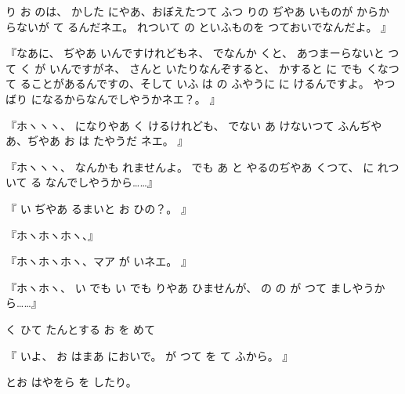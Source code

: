 り
お
のは、
かした
にやあ、おぼえたつて
ふつ
りの
ぢやあ
いものが
からか
らないが
て
るんだネエ。
れついて
の
といふものを
つておいでなんだよ。
』

『なあに、
ぢやあ
いんですけれどもネ、
でなんか
くと、
あつまーらないと
つて
く
が
いんですがネ、
さんと
いたりなんぞすると、
かすると
に
でも
くなつて
ることがあるんですの、そして
いふ
は
の
ふやうに
に
けるんですよ。
やつばり
になるからなんでしやうかネエ？。
』

『ホヽヽヽ、
になりやあ
く
けるけれども、
でない
あ
けないつて
ふんぢやあ、ぢやあ
お
は
たやうだ
ネエ。
』

『ホヽヽヽ、
なんかも
れませんよ。
でも
あ
と
やるのぢやあ
くつて、
に
れついて
る
なんでしやうから……』

『
い
ぢやあ
るまいと
お
ひの？。
』

『ホヽホヽホヽ、』

『ホヽホヽホヽ、マア
が
いネエ。
』

『ホヽホヽ、
い
でも
い
でも
りやあ
ひませんが、
の
の
が
つて
ましやうから……』

く
ひて
たんとする
お
を
めて

『
いよ、
お
はまあ
においで。
が
つて
を
て
ふから。
』

とお
はやをら
を
したり。

